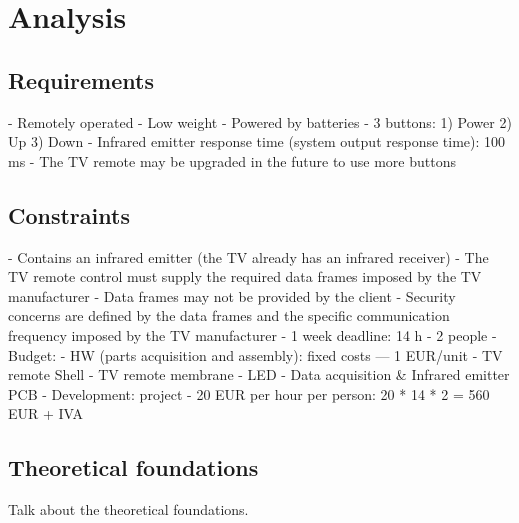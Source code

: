 \chapter{Analysis}
\label{ch:analysis}

\section{Requirements}
\label{sec:requirements}
- Remotely operated
- Low weight
- Powered by batteries
- 3 buttons:
  1) Power
  2) Up
  3) Down
- Infrared emitter response time (system output response time): 100 ms
- The TV remote may be upgraded in the future to use more buttons

\section{Constraints}
\label{sec:constraints}
- Contains an infrared emitter (the TV already has an infrared receiver)
- The TV remote control must supply the required data frames imposed by the TV
  manufacturer
- Data frames may not be provided by the client
- Security concerns are defined by the data frames and the specific
  communication frequency imposed by the TV manufacturer
- 1 week deadline: 14 h
- 2 people
- Budget:
  - HW (parts acquisition and assembly): fixed costs --- 1 EUR/unit
    - TV remote Shell
    - TV remote membrane
    - LED
    - Data acquisition \& Infrared emitter PCB
  - Development: project
    - 20 EUR per hour per person: 20 * 14 * 2 = 560 EUR + IVA

\section{Theoretical foundations}
\label{sec:theor-found}
Talk about the theoretical foundations.
